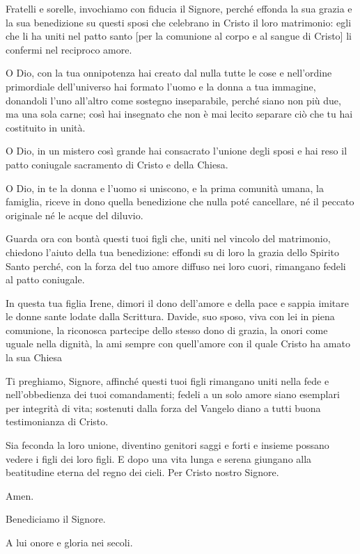 	\begin{dialoghi}
		\item[\sacerdote] Fratelli e sorelle, invochiamo con fiducia il Signore, perché effonda la sua grazia e la sua benedizione su questi sposi che celebrano in Cristo il loro matrimonio: egli che li ha uniti nel patto santo [per la comunione al corpo e al sangue di Cristo] li confermi nel reciproco amore.

		O Dio, con la tua onnipotenza hai creato dal nulla tutte le cose e nell'ordine primordiale dell'universo hai formato l'uomo e la donna a tua immagine, donandoli l'uno all'altro come sostegno inseparabile, perché siano non più due, ma una sola carne; così hai insegnato che non è mai lecito separare ciò che tu hai costituito in unità.

		O Dio, in un mistero così grande hai consacrato l'unione degli sposi e hai reso il patto coniugale sacramento di Cristo e della Chiesa.

		O Dio, in te la donna e l'uomo si uniscono, e la prima comunità umana, la famiglia, riceve in dono quella benedizione che nulla poté cancellare, né il peccato originale né le acque del diluvio.

		Guarda ora con bontà questi tuoi figli che, uniti nel vincolo del matrimonio, chiedono l'aiuto della tua benedizione: effondi su di loro la grazia dello Spirito Santo perché, con la forza del tuo amore diffuso nei loro cuori, rimangano fedeli al patto coniugale.

		In questa tua figlia Irene, dimori il dono dell'amore e della pace e sappia imitare le donne sante lodate dalla Scrittura. Davide, suo sposo, viva con lei in piena comunione, la riconosca partecipe dello stesso dono di grazia, la onori come uguale nella dignità, la ami sempre con quell'amore con il quale Cristo ha amato la sua Chiesa

		Ti preghiamo, Signore, affinché questi tuoi figli rimangano uniti nella fede e nell'obbedienza dei tuoi comandamenti; fedeli a un solo amore siano esemplari per integrità di vita; sostenuti dalla forza del Vangelo diano a tutti buona testimonianza di Cristo.

		Sia feconda la loro unione, diventino genitori saggi e forti e insieme possano vedere i figli dei loro figli. E dopo una vita lunga e serena giungano alla beatitudine eterna del regno dei cieli. Per Cristo nostro Signore.
		\item[\assemblea] Amen.
		\item[\sacerdote] Benediciamo il Signore.
		\item[\assemblea] A lui onore e gloria nei secoli.
	\end{dialoghi}

